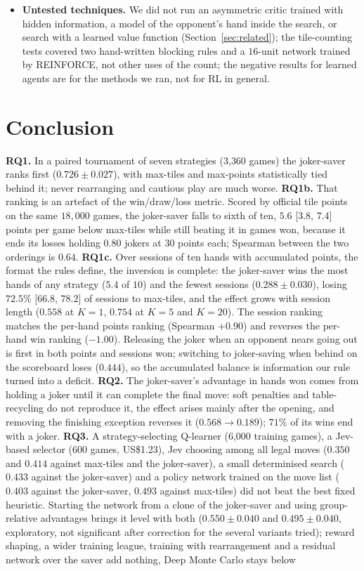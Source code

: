 \documentclass[11pt]{article}
\begin{document}
\begin{itemize}
\item \textbf{Untested techniques.} We did not run an asymmetric critic trained with hidden information, a model of the opponent's hand inside the search, or search with a learned value function (Section~\ref{sec:related}); the tile-counting tests covered two hand-written blocking rules and a $16$-unit network trained by REINFORCE, not other uses of the count; the negative results for learned agents are for the methods we ran, not for RL in general.
\end{itemize}

\section{Conclusion}
\textbf{RQ1.} In a paired tournament of seven strategies (3{,}360 games) the joker-saver ranks first ($0.726\pm0.027$), with max-tiles and max-points statistically tied behind it; never rearranging and cautious play are much worse. \textbf{RQ1b.} That ranking is an artefact of the win/draw/loss metric. Scored by official tile points on the same $18{,}000$ games, the joker-saver falls to sixth of ten, $5.6$ [$3.8$, $7.4$] points per game below max-tiles while still beating it in games won, because it ends its losses holding $0.80$ jokers at $30$ points each; Spearman between the two orderings is $0.64$. \textbf{RQ1c.} Over sessions of ten hands with accumulated points, the format the rules define, the inversion is complete: the joker-saver wins the most hands of any strategy ($5.4$ of $10$) and the fewest sessions ($0.288\pm0.030$), losing $72.5\%$ [$66.8$, $78.2$] of sessions to max-tiles, and the effect grows with session length ($0.558$ at $K{=}1$, $0.754$ at $K{=}5$ and $K{=}20$). The session ranking matches the per-hand points ranking (Spearman $+0.90$) and reverses the per-hand win ranking ($-1.00$). Releasing the joker when an opponent nears going out is first in both points and sessions won; switching to joker-saving when behind on the scoreboard loses ($0.444$), so the accumulated balance is information our rule turned into a deficit. \textbf{RQ2.} The joker-saver's advantage in hands won comes from holding a joker until it can complete the final move: soft penalties and table-recycling do not reproduce it, the effect arises mainly after the opening, and removing the finishing exception reverses it ($0.568\to0.189$); $71\%$ of its wins end with a joker. \textbf{RQ3.} A strategy-selecting Q-learner (6{,}000 training games), a Jev-based selector (600 games, US\$1.23), Jev choosing among all legal moves ($0.350$ and $0.414$ against max-tiles and the joker-saver), a small determinised search ($0.433$ against the joker-saver) and a policy network trained on the move list ($0.403$ against the joker-saver, $0.493$ against max-tiles) did not beat the best fixed heuristic. Starting the network from a clone of the joker-saver and using group-relative advantages brings it level with both ($0.550\pm0.040$ and $0.495\pm0.040$, exploratory, not significant after correction for the several variants tried); reward shaping, a wider training league, training with rearrangement and a residual network over the saver add nothing, Deep Monte Carlo stays below 
\end{document}
